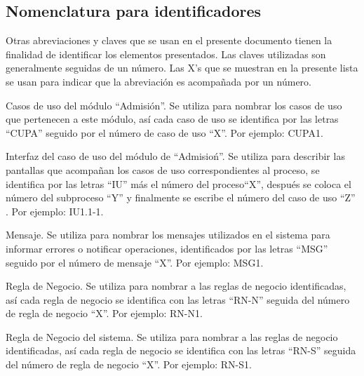\subsection{Nomenclatura para identificadores}

Otras abreviaciones y claves que se usan en el presente documento tienen la finalidad de identificar los elementos presentados. Las claves utilizadas son generalmente seguidas de un número. Las X’s que se muestran en la presente lista se usan para indicar que la abreviación es acompañada por un número.

\begin{description}
	
	
	 Casos de uso del módulo ``Admisión''. Se utiliza para nombrar los casos de uso que pertenecen a este módulo, así cada caso de uso se identifica por las letras ``CUPA'' seguido por el número de caso de uso ``X''. Por ejemplo: CUPA1.


	 Interfaz del caso de uso del módulo de ``Admisioń''. Se utiliza para describir las pantallas que acompañan los casos de uso correspondientes al proceso, se identifica por las letras ``IU'' más el número del proceso``X'', después se coloca el número del subproceso ``Y'' y finalmente se escribe el número del caso de uso ``Z'' . Por ejemplo: IU1.1-1.

	 Mensaje. Se utiliza para nombrar los mensajes utilizados en el sistema para informar errores o notificar operaciones, identificados por las letras ``MSG'' seguido por el número de mensaje ``X''. Por ejemplo: MSG1.
	
	 Regla de Negocio. Se utiliza para nombrar a las reglas de negocio identificadas, así cada regla de negocio se identifica con las letras ``RN-N'' seguida del número de regla de negocio ``X''. Por ejemplo: RN-N1.
	
	 Regla de Negocio del sistema. Se utiliza para nombrar a las reglas de negocio identificadas, así cada regla de negocio se identifica con las letras ``RN-S'' seguida del número de regla de negocio ``X''. Por ejemplo: RN-S1.		
\end{description}






















